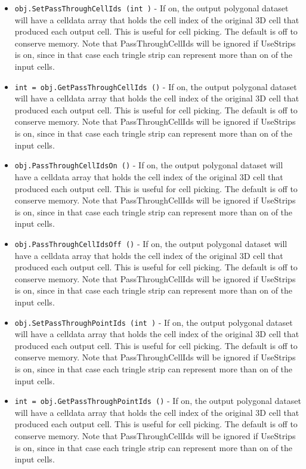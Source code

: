 \begin{itemize}
\item  \verb|obj.SetPassThroughCellIds (int )| -  If on, the output polygonal dataset will have a celldata array that 
 holds the cell index of the original 3D cell that produced each output
 cell. This is useful for cell picking. The default is off to conserve 
 memory. Note that PassThroughCellIds will be ignored if UseStrips is on,
 since in that case each tringle strip can represent more than on of the
 input cells.

\item  \verb|int = obj.GetPassThroughCellIds ()| -  If on, the output polygonal dataset will have a celldata array that 
 holds the cell index of the original 3D cell that produced each output
 cell. This is useful for cell picking. The default is off to conserve 
 memory. Note that PassThroughCellIds will be ignored if UseStrips is on,
 since in that case each tringle strip can represent more than on of the
 input cells.

\item  \verb|obj.PassThroughCellIdsOn ()| -  If on, the output polygonal dataset will have a celldata array that 
 holds the cell index of the original 3D cell that produced each output
 cell. This is useful for cell picking. The default is off to conserve 
 memory. Note that PassThroughCellIds will be ignored if UseStrips is on,
 since in that case each tringle strip can represent more than on of the
 input cells.

\item  \verb|obj.PassThroughCellIdsOff ()| -  If on, the output polygonal dataset will have a celldata array that 
 holds the cell index of the original 3D cell that produced each output
 cell. This is useful for cell picking. The default is off to conserve 
 memory. Note that PassThroughCellIds will be ignored if UseStrips is on,
 since in that case each tringle strip can represent more than on of the
 input cells.

\item  \verb|obj.SetPassThroughPointIds (int )| -  If on, the output polygonal dataset will have a celldata array that 
 holds the cell index of the original 3D cell that produced each output
 cell. This is useful for cell picking. The default is off to conserve 
 memory. Note that PassThroughCellIds will be ignored if UseStrips is on,
 since in that case each tringle strip can represent more than on of the
 input cells.

\item  \verb|int = obj.GetPassThroughPointIds ()| -  If on, the output polygonal dataset will have a celldata array that 
 holds the cell index of the original 3D cell that produced each output
 cell. This is useful for cell picking. The default is off to conserve 
 memory. Note that PassThroughCellIds will be ignored if UseStrips is on,
 since in that case each tringle strip can represent more than on of the
 input cells.


\end{itemize}
